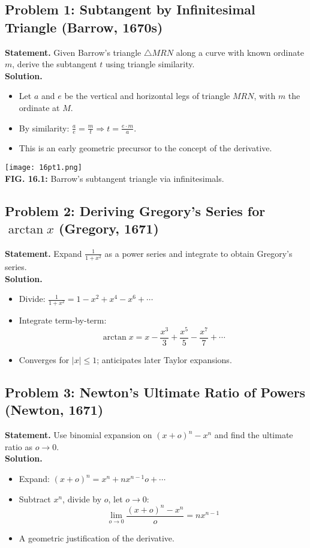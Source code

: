 \documentclass[9pt]{article}
\begin{document}
\subsection*{Problem 1: Subtangent by Infinitesimal Triangle (Barrow, 1670s)}
\textbf{Statement.} Given Barrow’s triangle \( \triangle MRN \) along a curve with known ordinate \( m \), derive the subtangent \( t \) using triangle similarity. \\
\textbf{Solution.}
\begin{itemize}
  \item Let \( a \) and \( e \) be the vertical and horizontal legs of triangle \( MRN \), with \( m \) the ordinate at \( M \).
  \item By similarity: \( \frac{a}{e} = \frac{m}{t} \Rightarrow t = \frac{e \cdot m}{a} \).
  \item This is an early geometric precursor to the concept of the derivative.
\end{itemize}
\begin{center}
\texttt{[image: 16pt1.png]} \\
\textbf{FIG. 16.1:} Barrow’s subtangent triangle via infinitesimals.
\end{center}

\newpage

\subsection*{Problem 2: Deriving Gregory’s Series for \( \arctan x \) (Gregory, 1671)}
\textbf{Statement.} Expand \( \frac{1}{1 + x^2} \) as a power series and integrate to obtain Gregory’s series. \\
\textbf{Solution.}
\begin{itemize}
  \item Divide: \( \frac{1}{1 + x^2} = 1 - x^2 + x^4 - x^6 + \cdots \)
  \item Integrate term-by-term:
  \[
  \arctan x = x - \frac{x^3}{3} + \frac{x^5}{5} - \frac{x^7}{7} + \cdots
  \]
  \item Converges for \( |x| \leq 1 \); anticipates later Taylor expansions.
\end{itemize}

\newpage

\subsection*{Problem 3: Newton’s Ultimate Ratio of Powers (Newton, 1671)}
\textbf{Statement.} Use binomial expansion on \( (x + o)^n - x^n \) and find the ultimate ratio as \( o \to 0 \). \\
\textbf{Solution.}
\begin{itemize}
  \item Expand: \( (x + o)^n = x^n + n x^{n-1} o + \cdots \)
  \item Subtract \( x^n \), divide by \( o \), let \( o \to 0 \):
  \[
  \lim_{o \to 0} \frac{(x + o)^n - x^n}{o} = n x^{n-1}
  \]
  \item A geometric justification of the derivative.
\end{itemize}
\end{document}
